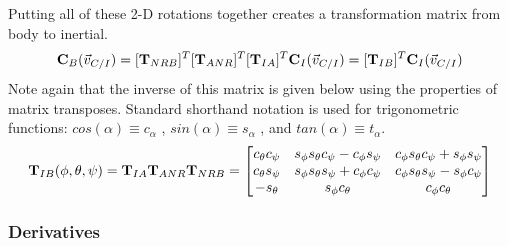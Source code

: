 \documentclass{article}
\begin{document}
Putting all of these 2-D rotations together creates a
transformation matrix from body to inertial. 
\begin{equation}
{\bf C}_{B}(\vec{v}_{C/I}) = [{\bf T}_{NRB}]^T[{\bf T}_{ANR}]^T[{\bf T}_{IA}]^T{\bf C}_{I}(\vec{v}_{C/I}) = [{\bf T}_{IB}]^T{\bf C}_{I}(\vec{v}_{C/I})
\end{equation}
Note again that the inverse of this matrix is given below using the properties of matrix transposes. Standard shorthand
notation is used for trigonometric functions: $ cos(\alpha) \equiv
c_{\alpha} $ , $ sin(\alpha) \equiv s_{\alpha} $ , and $ tan(\alpha)
\equiv t_{\alpha} $.
\begin{equation}\label{e:TIB}
{\bf T}_{IB}(\phi,\theta,\psi) = {\bf T}_{IA}{\bf T}_{ANR}{\bf T}_{NRB}=\begin{bmatrix} c_{\theta}c_{\psi} &
s_{\phi}s_{\theta}c_{\psi}-c_{\phi}s_{\psi} &
c_{\phi}s_{\theta}c_{\psi} + s_{\phi}s_{\psi} \\ c_{\theta}s_{\psi} &
s_{\phi}s_{\theta}s_{\psi} + c_{\phi}c_{\psi} &
c_{\phi}s_{\theta}s_{\psi} - s_{\phi}c_{\psi} \\
-s_{\theta} & s_{\phi}c_{\theta} & c_{\phi}c_{\theta}
\end{bmatrix}
\end{equation}

\subsubsection{Derivatives}
\end{document}
